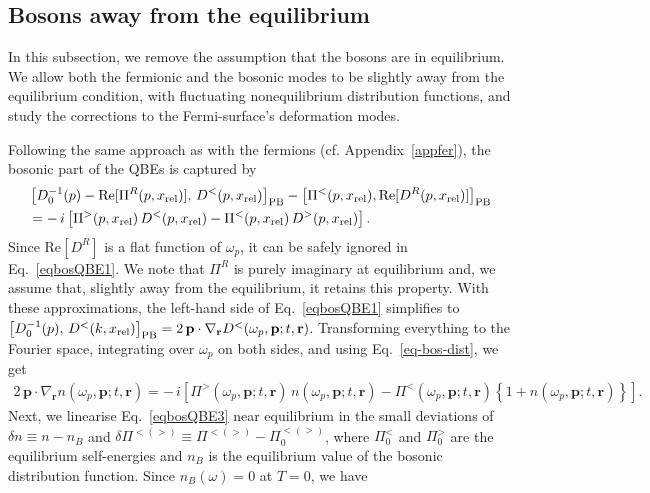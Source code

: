\documentclass[aps, prb, onecolumn, nofootinbib, citeautoscript, 10pt]{revtex4-2}
\def \nn{\nonumber \\}
\newcommand{\bp}{\mathbf{p}}
\newcommand{\br}{\mathbf{r}}
\begin{document}
\subsection{Bosons away from the equilibrium}
\label{sec-neq-bos}


In this subsection, we remove the assumption that the bosons are in equilibrium. We allow both the fermionic and the bosonic modes to be slightly away from the equilibrium condition, with fluctuating nonequilibrium distribution functions, and study the corrections to the Fermi-surface's deformation modes.

Following the same approach as with the fermions (cf. Appendix~\ref{appfer}), the bosonic part of the QBEs is captured by
\begin{align}
&    \left[D_0^{-1}(p)-\text{Re} [\Pi^R ( p, x_{\rm rel})] , 
\, D^< ( p, x_{\rm rel}) \right]_{\text{PB}}- 
\left[\Pi^< ( p, x_{\rm rel}) ,\text{Re}[D^R ( p, x_{\rm rel})] \right]_{\text{PB}}
\nn & 
= - \, i  \left [ \Pi^> ( p, x_{\rm rel})  \, D^< ( p, x_{\rm rel})   
-\Pi^< ( p, x_{\rm rel})  \, D^> ( p, x_{\rm rel}) \right ].
\label{eqbosQBE1}
\end{align}
Since $\text{Re}[D^R] $ is a flat function of $\omega_p$, it can be safely ignored in Eq.~\eqref{eqbosQBE1}. We note that $\Pi^R$ is purely imaginary at equilibrium and, we assume that, slightly away from the equilibrium, it retains this property. With these approximations, the left-hand side of Eq.~\eqref{eqbosQBE1} simplifies to $\left[D_0^{-1}(p),
\, D^< ( k, x_{\rm rel}) \right]_{\text{PB}} = 2 \,\bp \cdot \nabla_{\br} D^<(\omega_p, \bp;t, \br )$. Transforming everything to the Fourier space, integrating over $\omega_p $ on both sides, and using Eq.~\eqref{eq-bos-dist}, we get
\begin{align}
2 \, \bp \cdot \nabla_{\br} n( \omega_p, \bp;t, \br ) = - \, i  
\left [ \Pi^>( \omega_p , \bp;t, \br )
\, n( \omega_p, \bp ;t, \br )-\Pi^<(\omega_p , \bp;t, \br )
\left \lbrace 1 + n( \omega_p, \bp ;t, \br ) \right \rbrace \right ].
\label{eqbosQBE3}
\end{align}
Next, we linearise Eq.~\eqref{eqbosQBE3} near equilibrium in the small deviations of $\delta n \equiv n-n_B$ and $\delta \Pi^{<(>)} \equiv \Pi^{<(>)}-\Pi_0^{<(>)}$, where $\Pi_0^{<}$ and $\Pi_0^{>}$ are the equilibrium self-energies and $n_B$ is the equilibrium value of the bosonic distribution function. Since $n_B(\omega)=0$ at $ T =0 $, we have
\end{document}
